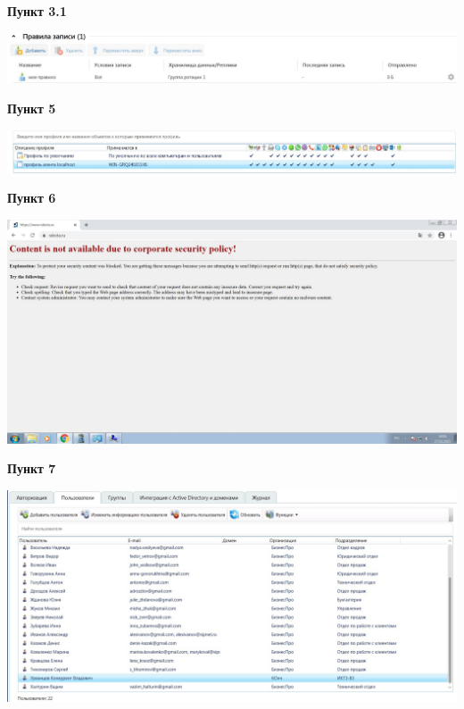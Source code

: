 \documentclass[a4paper,14pt]{extarticle}
\begin{document}
    \textbf{Пункт 3.1} \\
    \begin{center}
        \includegraphics[scale=0.3]{pics/3_1.jpg}
    \end{center}

    \textbf{Пункт 5} \\
    \begin{center}
        \includegraphics[scale=0.3]{pics/5.jpg}
    \end{center}

    \newpage
    \textbf{Пункт 6} \\
    \begin{center}
        \includegraphics[scale=0.25]{pics/6.jpg}
    \end{center}

    \textbf{Пункт 7} \\
    \begin{center}
        \includegraphics[scale=0.25]{pics/7.jpg}
    \end{center}
\end{document}
